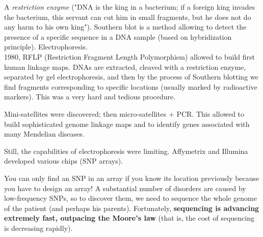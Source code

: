 \documentclass[main.tex]{subfiles}
\begin{document}
A \emph{restriction enzyme} ("DNA is the king in a bacterium; if a foreign king invades the bacterium, this servant can cut him in small fragments, but he does not do any harm to his own king").
Southern blot is a method allowing to detect the presence of a specific sequence in a DNA sample (based on hybridization principle).
Electrophoresis. \\

1980, RFLP (Restriction Fragment Length Polymorphism) allowed to build first human linkage maps. %
DNAs are extracted, cleaved with a restriction enzyme, separated by gel electrophoresis, and then by the process of Southern blotting we find fragments corresponding to specific locations (usually marked by radioactive markers).
This was a very hard and tedious procedure.

Mini-satellites were discovered; then micro-satellites + PCR.
This allowed to build sophisticated genome linkage maps and to identify genes associated with many Mendelian diseases.

Still, the capabilities of electrophoresis were limiting. Affymetrix and Illumina developed various chips (SNP arrays).

You can only find an SNP in an array if you know its location previously because you have to design an array!
A substantial number of disorders are caused by low-frequency SNPs, so to discover them, we need to sequence the whole genome of the patient (and perhaps his parents).
Fortunately, \textbf{sequencing is advancing extremely fast, outpacing the Moore's law} (that is, the cost of sequencing is decreasing rapidly).
\end{document}
